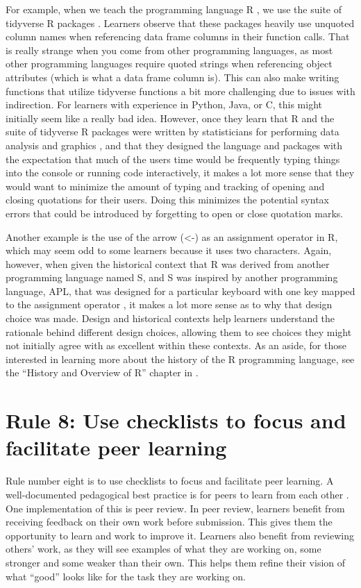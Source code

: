 \documentclass[
  10pt,
  letterpaper,
]{article}
\begin{document}
For example, when we teach the programming language R
\citep{ihaka1996r}, we use the suite of tidyverse R packages
\citep{tidyverse}. Learners observe that these packages heavily use
unquoted column names when referencing data frame columns in their
function calls. That is really strange when you come from other
programming languages, as most other programming languages require
quoted strings when referencing object attributes (which is what a data
frame column is). This can also make writing functions that utilize
tidyverse functions a bit more challenging due to issues with
indirection. For learners with experience in Python, Java, or C, this
might initially seem like a really bad idea. However, once they learn
that R and the suite of tidyverse R packages were written by
statisticians for performing data analysis and graphics
\citep{ihaka1996r, tidyverse}, and that they designed the language and
packages with the expectation that much of the users time would be
frequently typing things into the console or running code interactively,
it makes a lot more sense that they would want to minimize the amount of
typing and tracking of opening and closing quotations for their users.
Doing this minimizes the potential syntax errors that could be
introduced by forgetting to open or close quotation marks.

Another example is the use of the arrow (\textless-) as an assignment
operator in R, which may seem odd to some learners because it uses two
characters. Again, however, when given the historical context that R was
derived from another programming language named S, and S was inspired by
another programming language, APL, that was designed for a particular
keyboard with one key mapped to the assignment operator
\citep{fay2018assignment}, it makes a lot more sense as to why that
design choice was made. Design and historical contexts help learners
understand the rationale behind different design choices, allowing them
to see choices they might not initially agree with as excellent within
these contexts. As an aside, for those interested in learning more about
the history of the R programming language, see the ``History and
Overview of R'' chapter in \citep{peng2016r}.

\section{Rule 8: Use checklists to focus and facilitate peer
learning}\label{sec-rule8}

Rule number eight is to use checklists to focus and facilitate peer
learning. A well-documented pedagogical best practice is for peers to
learn from each other \citep{topping1998}. One implementation of this is
peer review. In peer review, learners benefit from receiving feedback on
their own work before submission. This gives them the opportunity to
learn and work to improve it. Learners also benefit from reviewing
others' work, as they will see examples of what they are working on,
some stronger and some weaker than their own. This helps them refine
their vision of what ``good'' looks like for the task they are working
on.
\end{document}
